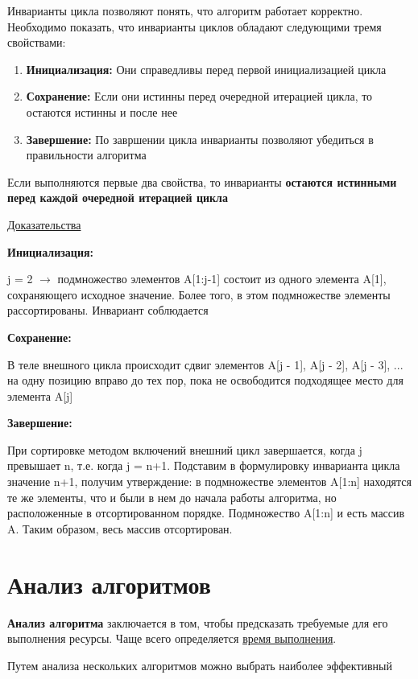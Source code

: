 \documentclass[a4paper, 12pt]{article}
\begin{document}
Инварианты цикла позволяют понять, что алгоритм работает корректно. Необходимо показать, 
что инварианты циклов обладают следующими тремя свойствами:

\begin{enumerate}
    \item \textbf{Инициализация:} Они справедливы перед первой инициализацией цикла
    \item \textbf{Сохранение:} Если они истинны перед очередной итерацией цикла, то остаются истинны и после нее
    \item \textbf{Завершение:} По завршении цикла инварианты позволяют убедиться в правильности алгоритма
\end{enumerate}

Если выполняются первые два свойства, то инварианты \textbf{остаются истинными перед каждой очередной итерацией цикла}

\underline{Доказательства}

\textbf{Инициализация:}

j = 2 $\rightarrow$ подмножество элементов A[1:j-1] состоит из одного элемента A[1], сохраняющего исходное значение. 
Более того, в этом подмножестве элементы рассортированы. Инвариант соблюдается

\textbf{Сохранение:} 

В теле внешного цикла происходит сдвиг элементов A[j - 1], A[j - 2], A[j - 3], ... на одну позицию вправо до тех пор, пока не освободится подходящее
место для элемента A[j]

\textbf{Завершение:}

При сортировке методом включений внешний цикл завершается, когда j превышает n, т.е. когда j = n+1. 
Подставим в формулировку инварианта цикла значение n+1, получим утверждение: в подмножестве элементов A[1:n]
находятся те же элементы, что и были в нем до начала работы алгоритма, но расположенные в отсортированном порядке.
Подмножество A[1:n] и есть массив A. Таким образом, весь массив отсортирован.

\section{Анализ алгоритмов}

\textbf{Анализ алгоритма} заключается в том, чтобы предсказать требуемые для его выполнения ресурсы. 
Чаще всего определяется \underline{время выполнения}.

Путем анализа нескольких алгоритмов можно выбрать наиболее эффективный
\end{document}
